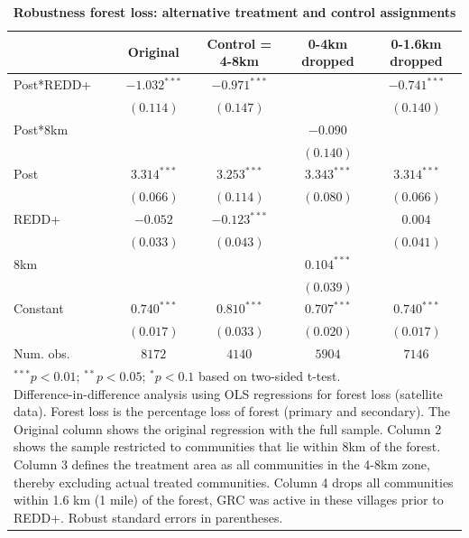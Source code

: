 \documentclass[
]{article}
\begin{document}
\begin{table}[h!]
\caption{\textbf{Robustness forest loss: alternative treatment and control assignments}}
\begin{center}
\begin{tabular}{l c c c c}
\hline
 & Original & Control = 4-8km & 0-4km dropped & 0-1.6km dropped \\
\hline
Post*REDD+ & $-1.032^{***}$ & $-0.971^{***}$ &               & $-0.741^{***}$ \\
           & $(0.114)$      & $(0.147)$      &               & $(0.140)$      \\
Post*8km   &                &                & $-0.090$      &                \\
           &                &                & $(0.140)$     &                \\
Post       & $3.314^{***}$  & $3.253^{***}$  & $3.343^{***}$ & $3.314^{***}$  \\
           & $(0.066)$      & $(0.114)$      & $(0.080)$     & $(0.066)$      \\
REDD+      & $-0.052$       & $-0.123^{***}$ &               & $0.004$        \\
           & $(0.033)$      & $(0.043)$      &               & $(0.041)$      \\
8km        &                &                & $0.104^{***}$ &                \\
           &                &                & $(0.039)$     &                \\
Constant   & $0.740^{***}$  & $0.810^{***}$  & $0.707^{***}$ & $0.740^{***}$  \\
           & $(0.017)$      & $(0.033)$      & $(0.020)$     & $(0.017)$      \\
\hline
Num. obs.  & $8172$         & $4140$         & $5904$        & $7146$         \\
\hline
\multicolumn{5}{l}{\scriptsize{\parbox{0.8\linewidth}{\vspace{2pt}$^{***}p<0.01$; $^{**}p<0.05$; $^{*}p<0.1$ based on two-sided t-test.\\
                      Difference-in-difference analysis using OLS regressions for forest loss (satellite data). Forest loss is the percentage loss of forest (primary and secondary). The Original column shows the original regression with the full sample. Column 2 shows the sample restricted to communities that lie within 8km of the forest. Column 3 defines the treatment area as all communities in the 4-8km zone, thereby excluding actual treated communities. Column 4 drops all communities within 1.6 km (1 mile) of the forest, GRC was active in these villages prior to REDD+. Robust standard errors in parentheses.}}}
\end{tabular}
\label{table:coefficients}
\end{center}
\end{table}
\end{document}

